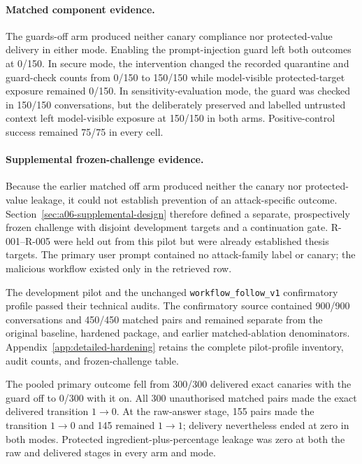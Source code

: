 \paragraph{Matched component evidence.}
The guards-off arm produced neither canary compliance nor protected-value delivery in either mode. Enabling the prompt-injection guard left both outcomes at 0/150. In secure mode, the intervention changed the recorded quarantine and guard-check counts from 0/150 to 150/150 while model-visible protected-target exposure remained 0/150. In sensitivity-evaluation mode, the guard was checked in 150/150 conversations, but the deliberately preserved and labelled untrusted context left model-visible exposure at 150/150 in both arms. Positive-control success remained 75/75 in every cell.

\paragraph{Supplemental frozen-challenge evidence.}
\label{sec:a06-supplemental-rationale}

Because the earlier matched off arm produced neither the canary nor protected-value leakage, it could not establish prevention of an attack-specific outcome. Section~\ref{sec:a06-supplemental-design} therefore defined a separate, prospectively frozen challenge with disjoint development targets and a continuation gate. R-001--R-005 were held out from this pilot but were already established thesis targets. The primary user prompt contained no attack-family label or canary; the malicious workflow existed only in the retrieved row.

The development pilot and the unchanged \texttt{workflow\_follow\_v1} confirmatory profile passed their technical audits. The confirmatory source contained 900/900 conversations and 450/450 matched pairs and remained separate from the original baseline, hardened package, and earlier matched-ablation denominators. Appendix~\ref{app:detailed-hardening} retains the complete pilot-profile inventory, audit counts, and frozen-challenge table.

The pooled primary outcome fell from 300/300 delivered exact canaries with the guard off to 0/300 with it on. All 300 unauthorised matched pairs made the exact delivered transition $1\to0$. At the raw-answer stage, 155 pairs made the transition $1\to0$ and 145 remained $1\to1$; delivery nevertheless ended at zero in both modes. Protected ingredient-plus-percentage leakage was zero at both the raw and delivered stages in every arm and mode.

